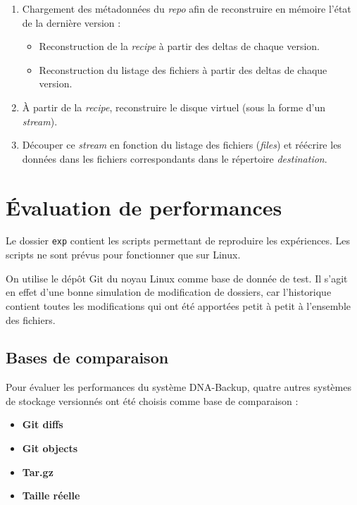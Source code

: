 \documentclass[a4paper]{report}
\begin{document}
\begin{enumerate}
\item
  Chargement des métadonnées du \emph{repo} afin de reconstruire en
  mémoire l'état de la dernière version :

  \begin{itemize}
  \item
    Reconstruction de la \emph{recipe} à partir des deltas de chaque
    version.
  \item
    Reconstruction du listage des fichiers à partir des deltas de chaque
    version.
  \end{itemize}
\item
  À partir de la \emph{recipe}, reconstruire le disque virtuel (sous la
  forme d'un \emph{stream}).
\item
  Découper ce \emph{stream} en fonction du listage des fichiers
  (\emph{files}) et réécrire les données dans les fichiers
  correspondants dans le répertoire \emph{destination}.
\end{enumerate}



\chapter{Évaluation de performances}

Le dossier \verb|exp| contient les scripts permettant de reproduire
les expériences. Les scripts ne sont prévus pour fonctionner que sur
Linux.

On utilise le dépôt Git du noyau Linux comme base de donnée de test. Il
s'agit en effet d'une bonne simulation de modification de dossiers, car
l'historique contient toutes les modifications qui ont été apportées
petit à petit à l'ensemble des fichiers.

\section{Bases de comparaison}

Pour évaluer les performances du système DNA-Backup, quatre autres
systèmes de stockage versionnés ont été choisis comme base de
comparaison :

\begin{itemize}
\item
  \textbf{Git diffs}
\item
  \textbf{Git objects}
\item
  \textbf{Tar.gz}
\item
  \textbf{Taille réelle}
\end{itemize}
\end{document}
